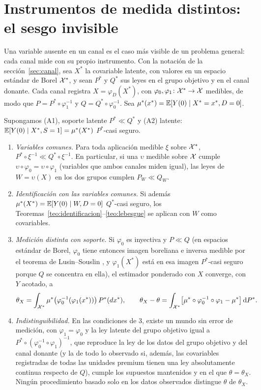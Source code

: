 \section{Instrumentos de medida distintos: el sesgo invisible}\label{sec:instrumentos}

Una variable ausente en un canal es el caso más visible de un problema general: cada canal mide con su propio instrumento. Con la notación de la sección~\ref{sec:canal}, sea $X^*$ la covariable latente, con valores en un espacio estándar de Borel $\mathcal{X}^*$, y sean $P^*$ y $Q^*$ sus leyes en el grupo objetivo y en el canal donante. Cada canal registra $X=\varphi_D(X^*)$, con $\varphi_0,\varphi_1\colon\mathcal{X}^*\to\mathcal{X}$ medibles, de modo que $P=P^*\circ\varphi_1^{-1}$ y $Q=Q^*\circ\varphi_0^{-1}$. Sea $\mu^*(x^*)=\mathbb{E}[Y(0)\mid X^*=x^*,D=0]$.

\begin{teorema}\label{teo:medicion}
Supongamos (A1), soporte latente $P^*\ll Q^*$ y (A2) latente: $\mathbb{E}[Y(0)\mid X^*,S=1]=\mu^*(X^*)$ $P^*$-casi seguro.
\begin{enumerate}
  \item \emph{Variables comunes.} Para toda aplicación medible $\xi$ sobre $\mathcal{X}^*$, $P^*\circ\xi^{-1}\ll Q^*\circ\xi^{-1}$. En particular, si una $\upsilon$ medible sobre $\mathcal{X}$ cumple $\upsilon\circ\varphi_0=\upsilon\circ\varphi_1$ (variables que ambos canales miden igual), las leyes de $W=\upsilon(X)$ en los dos grupos cumplen $P_W\ll Q_W$.
  \item \emph{Identificación con las variables comunes.} Si además $\mu^*(X^*)=\mathbb{E}[Y(0)\mid W,D=0]$ $Q^*$-casi seguro, los Teoremas~\ref{teo:identificacion}--\ref{teo:lebesgue} se aplican con $W$ como covariables.
  \item \emph{Medición distinta con soporte.} Si $\varphi_0$ es inyectiva y $P\ll Q$ (en espacios estándar de Borel, $\varphi_0$ tiene entonces imagen boreliana e inversa medible por el teorema de Lusin--Souslin \citep[teorema 15.1]{kechris1995}, y $\varphi_1(X^*)$ está en esa imagen $P^*$-casi seguro porque $Q$ se concentra en ella), el estimador ponderado con $X$ converge, con $Y$ acotado, a
  \[
  \theta_X=\int_{\mathcal{X}^*}\mu^*\bigl(\varphi_0^{-1}(\varphi_1(x^*))\bigr)\,P^*(dx^*),\qquad
  \theta_X-\theta=\int_{\mathcal{X}^*}\bigl[\mu^*\circ\varphi_0^{-1}\circ\varphi_1-\mu^*\bigr]\,\mathrm{d} P^*.
  \]
  \item \emph{Indistinguibilidad.} En las condiciones de 3, existe un mundo sin error de medición, con $\varphi_1=\varphi_0$ y la ley latente del grupo objetivo igual a $P^*\circ(\varphi_0^{-1}\circ\varphi_1)^{-1}$, que reproduce la ley de los datos del grupo objetivo y del canal donante (y la de todo lo observado si, además, las covariables registradas de todas las unidades premium tienen una ley absolutamente continua respecto de $Q$), cumple los supuestos mantenidos y en el que $\theta=\theta_X$. Ningún procedimiento basado solo en los datos observados distingue $\theta$ de $\theta_X$.
\end{enumerate}
\end{teorema}
